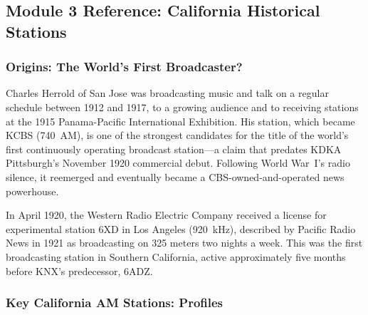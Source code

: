 \documentclass[11pt,letterpaper]{article}
\begin{document}
\begin{asciibox}
\subsection{Module 3 Reference: California Historical Stations}

\subsubsection{Origins: The World's First Broadcaster?}

Charles Herrold of San Jose was broadcasting music and talk on a regular schedule between 1912
and 1917, to a growing audience and to receiving stations at the 1915 Panama-Pacific International
Exhibition. His station, which became KCBS (740~AM), is one of the strongest candidates for the
title of the world's first continuously operating broadcast station---a claim that predates
KDKA Pittsburgh's November 1920 commercial debut. Following World War~I's radio silence, it
reemerged and eventually became a CBS-owned-and-operated news powerhouse.

In April 1920, the Western Radio Electric Company received a license for experimental station
6XD in Los Angeles (920~kHz), described by Pacific Radio News in 1921 as broadcasting on 325
meters two nights a week. This was the first broadcasting station in Southern California, active
approximately five months before KNX's predecessor, 6ADZ.

\subsubsection{Key California AM Stations: Profiles}


\end{asciibox}
\end{document}
